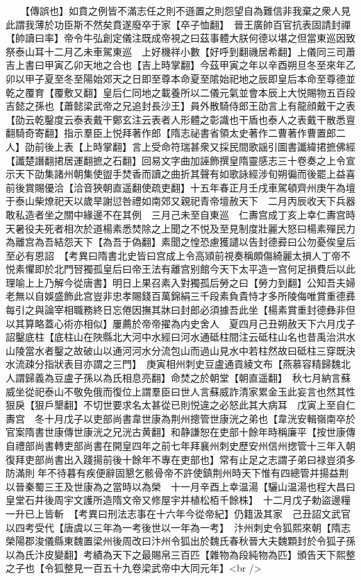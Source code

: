 　　【傳誤也】如賁之例皆不滿志任之則不遜置之則怨望自為難信非我棄之衆人見此謂我薄於功臣斯不然矣賁遂廢卒于家【卒子恤翻】　晉王廣帥百官抗表固請封禪【帥讀曰率】帝令牛弘創定儀注既成帝視之曰茲事體大朕何德以堪之但當東巡因致祭泰山耳十二月乙未車駕東巡　上好機祥小數【好呼到翻禨居希翻】上儀同三司蕭吉上書曰甲寅乙卯天地之合也【吉上時掌翻】今茲甲寅之年以辛酉朔旦冬至來年乙卯以甲子夏至冬至陽始郊天之日即至尊本命夏至隂始祀地之辰即皇后本命至尊德並乾之覆育【覆敷又翻】皇后仁同地之載養所以二儀元氣並會本辰上大悦賜物五百段吉懿之孫也【蕭懿梁武帝之兄追封長沙王】員外散騎侍郎王劭言上有龍顔戴干之表【劭云乾鑿度云泰表戴干鄭玄注云表者人形體之彰識也干盾也泰人之表戴干散悉亶翻騎奇寄翻】指示羣臣上悦拜著作郎【隋志祕書省領太史著作二曹著作曹置郎二人】劭前後上表【上時掌翻】言上受命符瑞甚衆又採民間歌謡引圖書讖緯捃摭佛經【讖楚譖翻捃居運翻摭之石翻】回易文字曲加誣飾撰皇隋靈感志三十卷奏之上令宣示天下劭集諸州朝集使盥手焚香而讀之曲折其聲有如歌詠經涉旬朔徧而後罷上益喜前後賞賜優洽【洽音狹朝直遥翻使疏吏翻】十五年春正月壬戌車駕頓齊州庚午為壇于泰山柴燎祀天以歲旱謝愆咎禮如南郊又親祀青帝壇赦天下　二月丙辰收天下兵器敢私造者坐之關中緣邊不在其例　三月己未至自東巡　仁夀宫成丁亥上幸仁夀宫時天暑役夫死者相次於道楊素悉焚除之上聞之不悦及至見制度壯麗大怒曰楊素殫民力為離宫為吾結怨天下【為吾于偽翻】素聞之惶恐慮獲譴以告封德彛曰公勿憂俟皇后至必有恩詔　【考異曰隋書北史皆曰宫成上令高熲前視奏稱頗傷綺麗太損人丁帝不悦素懼即於北門唘獨孤皇后曰帝王法有離宫别館今天下太平造一宫何足損費后以此理喻上上乃解今從唐書】明日上果召素入對獨孤后勞之曰【勞力到翻】公知吾夫婦老無以自娛盛飾此宫豈非忠孝賜錢百萬錦絹三千段素負貴恃才多所陵侮唯賞重德彞每引之與論宰相職務終日忘倦因撫其牀曰封郎必須據吾此坐【楊素賞重封德彝非但以其算略蓋心術亦相似】屢薦於帝帝擢為内史舍人　夏四月己丑朔赦天下六月戊子詔鑿底柱【底柱山在陜縣北大河中水經曰河水通砥柱間注云砥柱山名也昔禹治洪水山陵當水者鑿之故破山以通河河水分流包山而過山見水中若柱然故曰砥柱三穿既決水流疎分指狀表目亦謂之三門】　庚寅相州刺史豆盧通貢綾文布【燕慕容精歸魏北人謂歸義為豆盧子孫以為氏相息亮翻】命焚之於朝堂【朝直遥翻】　秋七月納言蘇威坐從祀泰山不敬免俄而復位上謂羣臣曰世人言蘇威詐清家累金玉此妄言也然其性狠戾【狠戶墾翻】不切世要求名太甚從已則悦違之必怒此其大病耳　戊寅上至自仁夀宫　冬十月戊子以吏部尚書韋世康為荆州摠管世康洸之弟也【韋洸安輯嶺南卒於官案隋書世康傳世康洸之兄洸古黄翻】和静謙恕在吏部十餘年時稱廉平【按世康傳自禮部尚書轉吏部尚書在開皇四年之前七年拜襄州刺史歷安州信州揔管十三年入朝復拜吏部尚書出入踐揚前後十餘年不專在吏部也】常有止足之志謂子弟曰禄豈須多防滿則年不待暮有疾便辭固懇乞骸骨帝不許使鎮荆州時天下惟有四總管并揚益荆以晉秦蜀三王及世康為之當時以為榮　十一月辛酉上幸温湯【驪山温湯也程大昌曰皇堂石井後周宇文護所造隋文帝又修屋宇并植松栢千餘株】　十二月戊子勅盜邊糧一升已上皆斬　【考異曰刑法志事在十六年今從帝紀】仍籍汲其家　己丑詔文武官以四考受代【唐虞以三年為一考後世以一年為一考】　汴州刺史令狐熙來朝【隋志榮陽郡浚儀縣東魏置梁州後周改曰汴州令狐出於魏氏春秋晉大夫魏顆封於令狐子孫以為氏汴皮變翻】考績為天下之最賜帛三百匹【雜物為段純物為匹】頒告天下熙整之子也【令狐整見一百五十九卷梁武帝中大同元年】<br />
